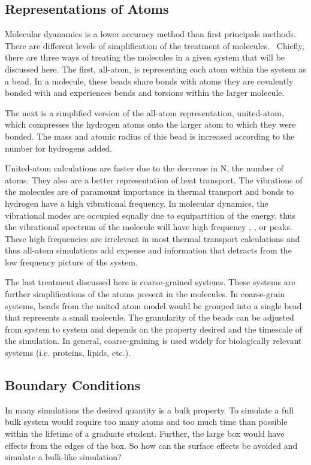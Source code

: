 \subsection{Representations of Atoms}
Molecular dyanamics is a lower accuracy method than first principals methods. There are different levels of simplification of the treatment of molecules.~\cite{Leach2001} 
Chiefly, there are three ways of treating the molecules in a given system that will be discussed here. 
The first, all-atom, is representing each atom within the system as a bead. In a molecule, these beads share bonds with atoms they are covalently bonded with and experiences bends and torsions within the larger molecule.

The next is a simplified version of the all-atom representation, united-atom, which compresses the hydrogen atoms onto the larger atom to which they were bonded. The mass and atomic radius of this bead is increased according to the number for hydrogens added.

United-atom calculations are faster due to the decrease in N, the number of atoms. They also are a better representation of heat transport. The vibrations of the molecules are of paramount importance in thermal transport and bonds to hydrogen have a high vibrational frequency. In molecular dynamics, the vibrational modes are occupied equally due to equipartition of the energy, thus the vibrational spectrum of the molecule will have high frequency , , or  peaks. These high frequencies are irrelevant in most thermal transport calculations and thus all-atom simulations add expense and information that detracts from the low frequency picture of the system.

The last treatment discussed here is coarse-grained systems. These systems are further simplifications of the atoms present in the molecules. In coarse-grain systems, beads from the united atom model would be grouped into a single bead that represents a small molecule. The granularity of the beads can be adjusted from system to system and depends on the property desired and the timescale of the simulation. In general, coarse-graining is used widely for biologically relevant systems (i.e. proteins, lipids, etc.).
    
\subsection{Boundary Conditions}
In many simulations the desired quantity is a bulk property. To simulate a full bulk system would require too many atoms and too much time than possible within the lifetime of a graduate student. Further, the large box would have effects from the edges of the box. So how can the surface effects be avoided and simulate a bulk-like simulation?

